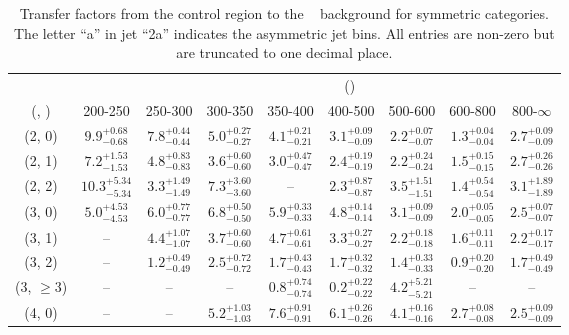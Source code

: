 \begin{table}[h!]
\tiny
\centering
\caption{Transfer factors from the \mmj control region to the \zInv~ background for symmetric categories. The letter ``a'' in jet \eg ``2a''  indicates the asymmetric jet bins. All entries are non-zero but are truncated to one decimal place.\label{tab:tf_zinv_mumu_sym}}
\begin{tabular}
{ccccccccc}
	\hline\hline
&	& \multicolumn{8}{c}{\scalht (\gev)} \\ 
	 (\njet,  \nb) & 200-250 & 250-300 & 300-350 & 350-400 & 400-500 & 500-600 & 600-800 & 800-$\infty$ \\ [0.8ex] 
\hline
	(2, 0) & $9.9^{+ 0.68 }_{- 0.68 }$ & $7.8^{+ 0.44 }_{- 0.44 }$ & $5.0^{+ 0.27 }_{- 0.27 }$ & $4.1^{+ 0.21 }_{- 0.21 }$ & $3.1^{+ 0.09 }_{- 0.09 }$ & $2.2^{+ 0.07 }_{- 0.07 }$ & $1.3^{+ 0.04 }_{- 0.04 }$ & $2.7^{+ 0.09 }_{- 0.09 }$ \\[0.5ex] 
	(2, 1) & $7.2^{+ 1.53 }_{- 1.53 }$ & $4.8^{+ 0.83 }_{- 0.83 }$ & $3.6^{+ 0.60 }_{- 0.60 }$ & $3.0^{+ 0.47 }_{- 0.47 }$ & $2.4^{+ 0.19 }_{- 0.19 }$ & $2.2^{+ 0.24 }_{- 0.24 }$ & $1.5^{+ 0.15 }_{- 0.15 }$ & $2.7^{+ 0.26 }_{- 0.26 }$ \\[0.5ex] 
	(2, 2) & $10.3^{+ 5.34 }_{- 5.34 }$ & $3.3^{+ 1.49 }_{- 1.49 }$ & $7.3^{+ 3.60 }_{- 3.60 }$ & -- & $2.3^{+ 0.87 }_{- 0.87 }$ & $3.5^{+ 1.51 }_{- 1.51 }$ & $1.4^{+ 0.54 }_{- 0.54 }$ & $3.1^{+ 1.89 }_{- 1.89 }$ \\[0.5ex] 
	(3, 0) & $5.0^{+ 4.53 }_{- 4.53 }$ & $6.0^{+ 0.77 }_{- 0.77 }$ & $6.8^{+ 0.50 }_{- 0.50 }$ & $5.9^{+ 0.33 }_{- 0.33 }$ & $4.8^{+ 0.14 }_{- 0.14 }$ & $3.1^{+ 0.09 }_{- 0.09 }$ & $2.0^{+ 0.05 }_{- 0.05 }$ & $2.5^{+ 0.07 }_{- 0.07 }$ \\[0.5ex] 
	(3, 1) & -- & $4.4^{+ 1.07 }_{- 1.07 }$ & $3.7^{+ 0.60 }_{- 0.60 }$ & $4.7^{+ 0.61 }_{- 0.61 }$ & $3.3^{+ 0.27 }_{- 0.27 }$ & $2.2^{+ 0.18 }_{- 0.18 }$ & $1.6^{+ 0.11 }_{- 0.11 }$ & $2.2^{+ 0.17 }_{- 0.17 }$ \\[0.5ex] 
	(3, 2) & -- & $1.2^{+ 0.49 }_{- 0.49 }$ & $2.5^{+ 0.72 }_{- 0.72 }$ & $1.7^{+ 0.43 }_{- 0.43 }$ & $1.7^{+ 0.32 }_{- 0.32 }$ & $1.4^{+ 0.33 }_{- 0.33 }$ & $0.9^{+ 0.20 }_{- 0.20 }$ & $1.7^{+ 0.49 }_{- 0.49 }$ \\[0.5ex] 
	(3, $\ge3$) & -- & -- & -- & $0.8^{+ 0.74 }_{- 0.74 }$ & $0.2^{+ 0.22 }_{- 0.22 }$ & $4.2^{+ 5.21 }_{- 5.21 }$ & -- & -- \\[0.5ex] 
	(4, 0) & -- & -- & $5.2^{+ 1.03 }_{- 1.03 }$ & $7.6^{+ 0.91 }_{- 0.91 }$ & $6.1^{+ 0.26 }_{- 0.26 }$ & $4.1^{+ 0.16 }_{- 0.16 }$ & $2.7^{+ 0.08 }_{- 0.08 }$ & $2.5^{+ 0.09 }_{- 0.09 }$ \\[0.5ex] 

\end{tabular}
\end{table}
